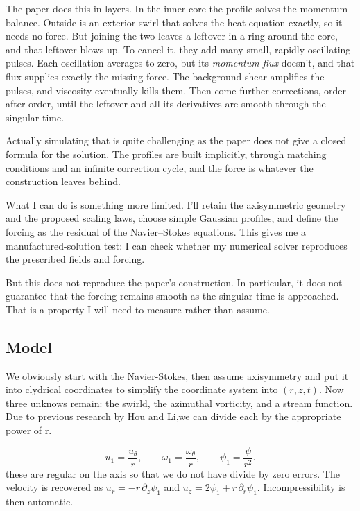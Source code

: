 The paper does this in layers. In the inner core the profile solves the momentum balance. Outside is an exterior swirl that solves the heat equation exactly, so it needs no force. But joining the two leaves a leftover in a ring around the core, and that leftover blows up. To cancel it, they add many small, rapidly oscillating pulses. Each oscillation averages to zero, but its \emph{momentum flux} doesn't, and that flux supplies exactly the missing force. The background shear amplifies the pulses, and viscosity eventually kills them. Then come further corrections, order after order, until the leftover and all its derivatives are smooth through the singular time.

Actually simulating that is quite challenging as the paper does not give a closed formula for the solution. The profiles are built implicitly, through matching conditions and an infinite correction cycle, and the force is whatever the construction leaves behind.

What I can do is something more limited. I'll retain the axisymmetric geometry and the proposed scaling laws, choose simple Gaussian profiles, and define the forcing as the residual of the Navier–Stokes equations. This gives me a manufactured-solution test: I can check whether my numerical solver reproduces the prescribed fields and forcing.

But this does not reproduce the paper's construction. In particular, it does not guarantee that the forcing remains smooth as the singular time is approached. That is a property I will need to measure rather than assume.

\subsection{Model}

We obviously start with the Navier-Stokes, then assume axisymmetry and put it into clydrical coordinates to simplify the coordinate system into $(r,z,t)$. Now three unknows remain: the swirld, the azimuthal vorticity, and a stream function. Due to previous research by Hou and Li,we can divide each by the appropriate power of r.

\[
	u_1=\frac{u_\theta}{r},\qquad \omega_1=\frac{\omega_\theta}{r},\qquad \psi_1=\frac{\psi}{r^2}.
\]
these are regular on the axis so that we do not have divide by zero errors. The velocity is recovered as $u_r=-r\,\partial_z\psi_1$ and $u_z = 2\psi_1 + r\,\partial_r\psi_1$. Incompressibility is then automatic.

